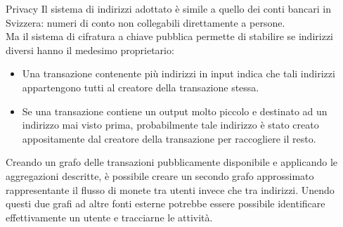 \documentclass[italian]{beamer}
\begin{document}
\begin{frame}{Privacy} %
\justifying
Il sistema di indirizzi adottato è simile a quello dei conti bancari in Svizzera: numeri di conto non collegabili direttamente a persone.\\
Ma il sistema di cifratura a chiave pubblica permette di stabilire se indirizzi diversi hanno il medesimo proprietario:
\begin{itemize}
\justifying
 \item Una transazione contenente più indirizzi in input indica che tali indirizzi appartengono tutti al creatore della transazione stessa.
 \item Se una transazione contiene un output molto piccolo e destinato ad un indirizzo mai visto prima, probabilmente tale indirizzo è stato creato appositamente dal creatore della transazione per raccogliere il resto.
\end{itemize}
Creando un grafo delle transazioni pubblicamente disponibile e applicando le aggregazioni descritte, è possibile creare un secondo grafo approssimato rappresentante il flusso di monete tra utenti invece che tra indirizzi. Unendo questi due grafi ad altre fonti esterne potrebbe essere possibile identificare effettivamente un utente e tracciarne le attività.
\end{frame}
\end{document}
